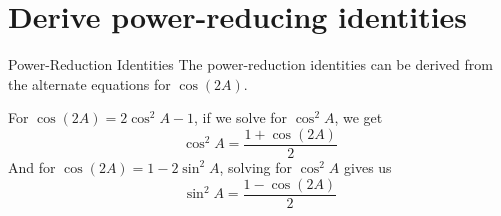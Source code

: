 \documentclass[t,usenames,dvipsnames]{beamer}
\begin{document}
\section{Derive power-reducing identities}

\begin{frame}{Power-Reduction Identities}
    The power-reduction identities can be derived from the alternate equations for $\cos(2A)$.   \newline\\  \pause
    
    For $\cos(2A) = 2\cos^2A - 1$, if we solve for $\cos^2 A$, we get
    \[
    \cos^2 A = \frac{1+\cos(2A)}{2}
    \]
    \pause
    And for $\cos(2A) = 1 - 2\sin^2 A$, solving for $\cos^2 A$ gives us
    \[
    \sin^2 A = \frac{1-\cos(2A)}{2}
    \]
\end{frame}
\end{document}
